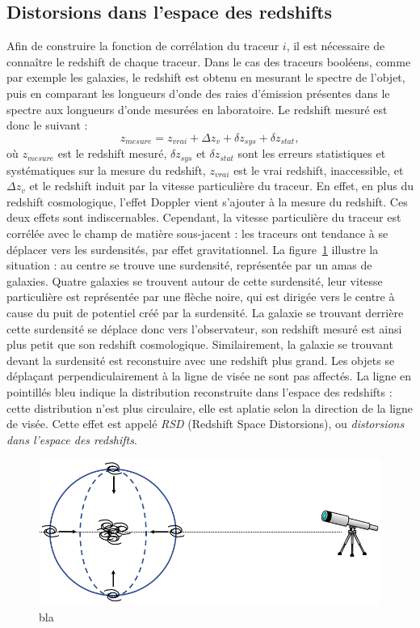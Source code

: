 \documentclass[11pt, twoside, a4paper, openright]{report}
\begin{document}
\subsection{Distorsions dans l'espace des redshifts}
Afin de construire la fonction de corrélation du traceur $i$, il est nécessaire de connaître le redshift de chaque traceur. Dans le cas des traceurs booléens, comme par exemple les galaxies, le redshift est obtenu en mesurant le spectre de l'objet, puis en comparant les longueurs d'onde des raies d'émission présentes dans le spectre aux longueurs d'onde mesurées en laboratoire. Le redshift mesuré est donc le suivant :
\begin{equation}
  z_{mesure} = z_{vrai} + \Delta z_{v} + \delta z_{sys} + \delta z_{stat} ,
\end{equation}
où $z_{mesure}$ est le redshift mesuré, $\delta z_{sys}$ et $\delta z_{stat}$ sont les erreurs statistiques et systématiques sur la mesure du redshift, $z_{vrai}$ est le vrai redshift, inaccessible, et $\Delta z_{v}$ et le redshift induit par la vitesse particulière du traceur. En effet, en plus du redshift cosmologique, l'effet Doppler vient s'ajouter à la mesure du redshift. Ces deux effets sont indiscernables. Cependant, la vitesse particulière du traceur est corrélée avec le champ de matière sous-jacent : les traceurs ont tendance à se déplacer vers les surdensités, par effet gravitationnel. La figure~\ref{fig:schema_rsd} illustre la situation : au centre se trouve une surdensité, représentée par un amas de galaxies. Quatre galaxies se trouvent autour de cette surdensité, leur vitesse particulière est représentée par une flèche noire, qui est dirigée vers le centre à cause du puit de potentiel créé par la surdensité. La galaxie se trouvant derrière cette surdensité se déplace donc vers l'observateur, son redshift mesuré est ainsi plus petit que son redshift cosmologique. Similairement, la galaxie se trouvant devant la surdensité est reconstuire avec une redshift plus grand. Les objets se déplaçant perpendiculairement à la ligne de visée ne sont pas affectés. La ligne en pointillés bleu indique la distribution reconstruite dans l'espace des redshifts : cette distribution n'est plus circulaire, elle est aplatie selon la direction de la ligne de visée. Cette effet est appelé \emph{RSD} (Redshift Space Distorsions), ou \emph{distorsions dans l'espace des redshifts}.
\begin{figure}
  \centering
  \includegraphics[scale=0.3]{schema_rsd}
  \caption{bla}
  \label{fig:schema_rsd}
\end{figure}
\end{document}
